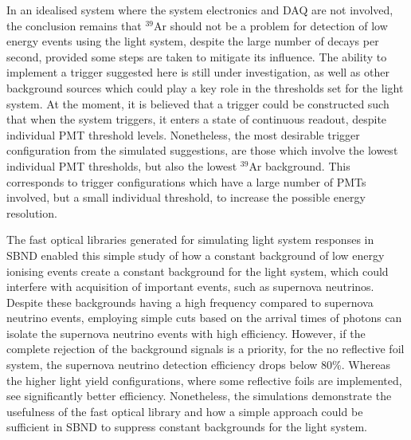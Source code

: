 \documentclass[a4paper]{article}
\begin{document}
In an idealised system where the system electronics and DAQ are not involved, the conclusion remains that $^{39}$Ar should not be a problem for detection of low energy events using the light system, despite the large number of decays per second, provided some steps are taken to mitigate its influence. The ability to implement a trigger suggested here is still under investigation, as well as other background sources which could play a key role in the thresholds set for the light system. At the moment, it is believed that a trigger could be constructed such that when the system triggers, it enters a state of continuous readout, despite individual PMT threshold levels. Nonetheless, the most desirable trigger configuration from the simulated suggestions, are those which involve the lowest individual PMT thresholds, but also the lowest $^{39}$Ar background. This corresponds to trigger configurations which have a large number of PMTs involved, but a small individual threshold, to increase the possible energy resolution.

The fast optical libraries generated for simulating light system responses in SBND enabled this simple study of how a constant background of low energy ionising events create a constant background for the light system, which could interfere with acquisition of important events, such as supernova neutrinos. Despite these backgrounds having a high frequency compared to supernova neutrino events, employing simple cuts based on the arrival times of photons can isolate the supernova neutrino events with high efficiency. However, if the complete rejection of the background signals is a priority, for the no reflective foil system, the supernova neutrino detection efficiency drops below 80\%. Whereas the higher light yield configurations, where some reflective foils are implemented, see significantly better efficiency. Nonetheless, the simulations demonstrate the usefulness of the fast optical library and how a simple approach could be sufficient in SBND to suppress constant backgrounds for the light system.

\end{document}
